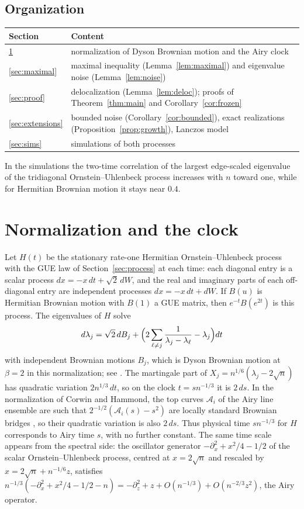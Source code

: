 \documentclass[11pt]{amsart}
\theoremstyle{remark}
\begin{document}
\subsection{Organization}
\begin{center}
\small
\begin{tabular}{ll}
\toprule
Section & Content\\
\midrule
\ref{sec:normal} & normalization of Dyson Brownian motion and the Airy clock\\
\ref{sec:maximal} & maximal inequality (Lemma~\ref{lem:maximal}) and eigenvalue noise (Lemma~\ref{lem:noise})\\
\ref{sec:proof} & delocalization (Lemma~\ref{lem:deloc}); proofs of Theorem~\ref{thm:main} and
Corollary~\ref{cor:frozen}\\
\ref{sec:extensions} & bounded noise (Corollary~\ref{cor:bounded}), exact realizations
(Proposition~\ref{prop:growth}), Lanczos model\\
\ref{sec:sims} & simulations of both processes\\
\bottomrule
\end{tabular}
\end{center}
In the simulations the two-time correlation of the largest edge-scaled eigenvalue of the tridiagonal
Ornstein--Uhlenbeck process increases with $n$ toward one, while for Hermitian Brownian motion it stays near $0.4$.

\section{Normalization and the clock}\label{sec:normal}

Let $H(t)$ be the stationary rate-one Hermitian Ornstein--Uhlenbeck process with the GUE law of
Section~\ref{sec:process} at each time: each diagonal entry is a scalar process $dx=-x\,dt+\sqrt2\,dW$, and the real
and imaginary parts of each off-diagonal entry are independent processes $dx=-x\,dt+dW$. If $B(u)$ is Hermitian
Brownian motion with $B(1)$ a GUE matrix, then $e^{-t}B(e^{2t})$ is this process. The eigenvalues of $H$ solve
\begin{equation}\label{eq:DBM}
d\lambda_j=\sqrt2\,dB_j+\Bigl(2\sum_{\ell\ne j}\frac{1}{\lambda_j-\lambda_\ell}-\lambda_j\Bigr)dt
\end{equation}
with independent Brownian motions $B_j$, which is Dyson Brownian motion at $\beta=2$ in this normalization; see
\cite[Section~4.3]{AGZ10}. The martingale part of $X_j=n^{1/6}(\lambda_j-2\sqrt n)$ has quadratic variation
$2n^{1/3}\,dt$, so on the clock $t=sn^{-1/3}$ it is $2\,ds$. In the normalization of Corwin and Hammond, the top curves
$\mathcal A_i$ of the Airy line ensemble are such that $2^{-1/2}(\mathcal A_i(s)-s^2)$ are locally standard Brownian
bridges \cite[equation~(4) and Theorem~3.1]{CH14}, so their quadratic variation is also $2\,ds$. Thus physical time
$sn^{-1/3}$ for $H$ corresponds to Airy time $s$, with no further constant. The same time scale appears from the
spectral side: the oscillator generator $-\partial_x^2+x^2/4-1/2$ of the scalar Ornstein--Uhlenbeck process, centred at
$x=2\sqrt n$ and rescaled by $x=2\sqrt n+n^{-1/6}z$, satisfies
$n^{-1/3}(-\partial_x^2+x^2/4-1/2-n)=-\partial_z^2+z+O(n^{-1/3})+O(n^{-2/3}z^2)$, the Airy operator.
\end{document}
